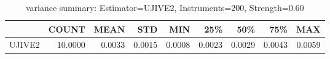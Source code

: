 \begin{table}[ht]
\centering
\caption{variance summary: Estimator=UJIVE2, Instruments=200, Strength=0.60}
\begin{tabular}{lrrrrrrrr}
\toprule
 & COUNT & MEAN & STD & MIN & 25\% & 50\% & 75\% & MAX \\
\midrule
UJIVE2 & 10.0000 & 0.0033 & 0.0015 & 0.0008 & 0.0023 & 0.0029 & 0.0043 & 0.0059 \\
\bottomrule
\end{tabular}
\end{table}
